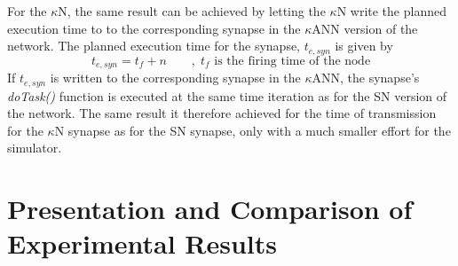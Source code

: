 		For the $\kappa$N, the same result can be achieved by letting the $\kappa$N write the planned execution time to to the corresponding synapse in the $\kappa$ANN version of the network.
		The planned execution time for the synapse, $t_{e, syn}$ is given by
		\begin{equation}
			t_{e,syn} = t_f+n \qquad, \; \text{$t_f$ is the firing time of the node}
		\end{equation}
		If $t_{e, syn}$ is written to the corresponding synapse in the $\kappa$ANN, the synapse's \emph{doTask()} function is executed at the same time iteration as for the SN version of the network.
		The same result it therefore achieved for the time of transmission for the $\kappa$N synapse as for the SN synapse, only with a much smaller effort for the simulator.



























\section{Presentation and Comparison of Experimental Results}
\label{secComparisonOfMechanismsOfNodeElements}
